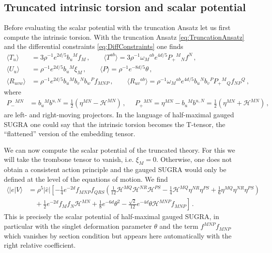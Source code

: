 \documentclass{PoS}
\newcommand{\gH}{\mathcal{H}}
\begin{document}
\subsection{Truncated intrinsic torsion and scalar potential}
Before evaluating the scalar potential with the truncation Ansatz let us first compute the intrinsic torsion. With the truncation Ansatz \eqref{eq:TruncationAnsatz} and the differential constraints \eqref{eq:DiffConstraints} one finds
\begin{equation}
 \begin{split}
  \langle T_u \rangle &= 3 \rho^{-1} e^{2d/5} b_u{}^M f_M \,, \qquad \langle T^{ab} \rangle = 3 \rho^{-1} \omega_M{}^{ab} e^{4d/5} P_+{}^M{}_N f^N \,, \\
  \langle U_u \rangle &= \rho^{-1} e^{2d/5} b_u{}^M \xi_M \,, \qquad \langle P \rangle = \rho^{-1} e^{-8d/5} \theta \,, \\
  \langle R_{uvw} \rangle &= \rho^{-1} e^{2d/5} b_u{}^M b_v{}^N b_w{}^P f_{MNP} \,, \qquad \langle R_{uv}{}^{ab} \rangle = \rho^{-1} \omega_M{}^{ab} e^{4d/5} b_u{}^N b_v{}^P P_+{}^M{}_Q f_{NP}{}^Q \,,
 \end{split} \label{eq:TruncatedIntrinsicTorsion}
\end{equation}
where
\begin{equation}
 \begin{split}
  P_{-}{}^{MN} &= b_u{}^M b^{u,N} = \frac12 \left( \eta^{MN} - \gH^{MN} \right) \,, \quad \,\, P_+{}^{MN} = \eta^{MN} - b_u{}^M b^{u,N} = \frac12 \left( \eta^{MN} + \gH^{MN} \right) \,,
 \end{split}
\end{equation}
are left- and right-moving projectors. In the language of half-maximal gauged SUGRA one could say that the intrinsic torsion becomes the T-tensor, the ``flattened'' version of the embedding tensor.

We can now compute the scalar potential of the truncated theory. For this we will take the trombone tensor to vanish, i.e. $\xi_M = 0$. Otherwise, one does not obtain a consistent action principle and the gauged SUGRA would only be defined at the level of the equations of motion. We find
\begin{equation}
 \begin{split}
 \langle |e| V \rangle &= \rho^{5} |\hat{e}| \left[ - \frac14 e^{-2d} f_{MNP} f_{QRS} \left( \frac1{12} \gH^{MQ} \gH^{NR} \gH^{PS} - \frac14 \gH^{MQ} \eta^{NR} \eta^{PS} + \frac16 \eta^{MQ} \eta^{NR} \eta^{PS} \right) \right. \\
  & \left. \quad + \frac12 e^{-2d} f_M f_N \gH^{MN} + \frac18 e^{-6d} \theta^2 - \frac{\sqrt{2}}{12} e^{-4d} \theta \gH^{MNP} f_{MNP} \right] \,.
 \end{split}
\end{equation}
This is precisely the scalar potential of half-maximal gauged SUGRA, in particular with the singlet deformation parameter $\theta$ and the term $f^{MNP} f_{MNP}$ which vanishes by section condition but appears here automatically with the right relative coefficient.
\end{document}
